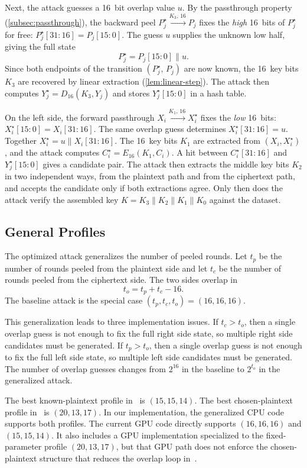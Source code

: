 \documentclass[version=preprint]{iacrcc}
\begin{document}
Next, the attack guesses a 16~bit overlap value $u$.
By the passthrough property (\autoref{subsec:passthrough}), the backward peel $P_j^{\star} \xrightarrow{K_3,\,16} P_j$ fixes the \emph{high} 16~bits of $P_j^{\star}$ for free:
$P_j^{\star}[31:16] = P_j[15:0]$.
The guess $u$ supplies the unknown low half, giving the full state
\[
P_j^{\star} = P_j[15:0] \| u.
\]
Since both endpoints of the transition $(P_j^{\star},\, P_j)$ are now known, the 16~key bits $K_3$ are recovered by linear extraction (\autoref{lem:linear-step}).
The attack then computes $Y_j^{\star} = D_{16}(K_3, Y_j)$ and stores $Y_j^{\star}[15:0]$ in a hash table.

On the left side, the forward passthrough $X_i \xrightarrow{K_1,\,16} X_i^{\star}$ fixes the \emph{low} 16~bits:
$X_i^{\star}[15:0] = X_i[31:16]$.
The same overlap guess determines $X_i^{\star}[31:16] = u$.
Together $X_i^{\star} = u \| X_i[31:16]$.
The 16~key bits $K_1$ are extracted from $(X_i, X_i^{\star})$, and the attack computes $C_i^{\star} = E_{16}(K_1, C_i)$.
A hit between $C_i^{\star}[31:16]$ and $Y_j^{\star}[15:0]$ gives a candidate pair.
The attack then extracts the middle key bits $K_2$ in two independent ways, from the plaintext path and from the ciphertext path, and accepts the candidate only if both extractions agree.
Only then does the attack verify the assembled key $K = K_3 \| K_2 \| K_1 \| K_0$ against the dataset.

\subsection{General Profiles}

The optimized attack generalizes the number of peeled rounds.
Let $t_p$ be the number of rounds peeled from the plaintext side and let $t_c$ be the number of rounds peeled from the ciphertext side.
The two sides overlap in
\[
t_o = t_p + t_c - 16.
\]
The baseline attack is the special case $(t_p,t_c,t_o)=(16,16,16)$.

This generalization leads to three implementation issues.
If $t_c > t_o$, then a single overlap guess is not enough to fix the full right side state, so multiple right side candidates must be generated.
If $t_p > t_o$, then a single overlap guess is not enough to fix the full left side state, so multiple left side candidates must be generated.
The number of overlap guesses changes from $2^{16}$ in the baseline to $2^{t_o}$ in the generalized attack.

The best known-plaintext profile in~\cite{indesteege2008practical} is $(15,15,14)$.
The best chosen-plaintext profile in~\cite{indesteege2008practical} is $(20,13,17)$.
In our implementation, the generalized CPU code supports both profiles.
The current GPU code directly supports $(16,16,16)$ and $(15,15,14)$.
It also includes a GPU implementation specialized to the fixed-parameter profile $(20,13,17)$, but that GPU path does not enforce the chosen-plaintext structure that reduces the overlap loop in~\cite{indesteege2008practical}.
\end{document}
